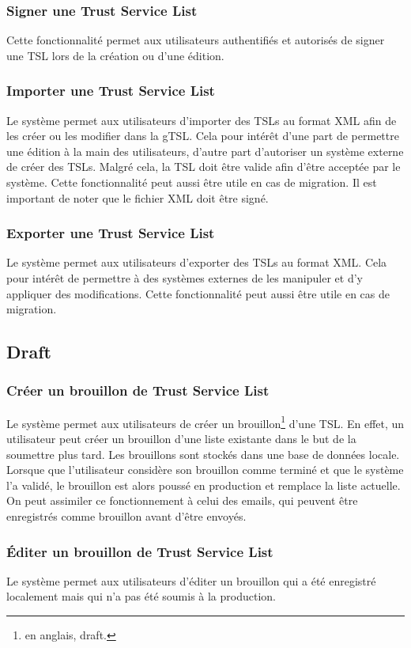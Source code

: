 \documentclass{tnreport}
\begin{document}
\subsubsection{Signer une Trust Service List}
Cette fonctionnalité permet aux utilisateurs authentifiés et autorisés de signer une TSL lors de la création ou d'une édition.
\subsubsection{Importer une Trust Service List}
Le système permet aux utilisateurs d'importer des TSLs au format XML afin de les créer ou les modifier dans la gTSL. Cela pour intérêt d'une part de permettre une édition à la main des utilisateurs, d'autre part d'autoriser un système externe de créer des TSLs. Malgré cela, la TSL doit être valide afin d'être acceptée par le système. Cette fonctionnalité peut aussi être utile en cas de migration. Il est important de noter que le fichier XML doit être signé.
\subsubsection{Exporter une Trust Service List}
Le système permet aux utilisateurs d'exporter des TSLs au format XML. Cela pour intérêt de permettre à des systèmes externes de les manipuler et d'y appliquer des modifications. Cette fonctionnalité peut aussi être utile en cas de migration.

\subsection{Draft}
\subsubsection{Créer un brouillon de Trust Service List}
Le système permet aux utilisateurs de créer un brouillon\footnote{en anglais, draft.} d'une TSL. En effet, un utilisateur peut créer un brouillon d'une liste existante dans le but de la soumettre plus tard. Les brouillons sont stockés dans une base de données locale. Lorsque que l'utilisateur considère son brouillon comme terminé et que le système l'a validé, le brouillon est alors poussé en production et remplace la liste actuelle. On peut assimiler ce fonctionnement à celui des emails, qui peuvent être enregistrés comme brouillon avant d'être envoyés.
\subsubsection{Éditer un brouillon de Trust Service List}
Le système permet aux utilisateurs d'éditer un brouillon qui a été enregistré localement mais qui n'a pas été soumis à la production.
\end{document}
